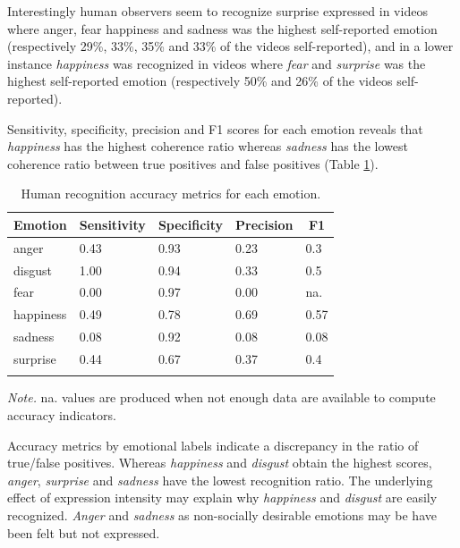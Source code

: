 \documentclass[
  english,
  doc]{apa7}
\begin{document}
Interestingly human observers seem to recognize surprise expressed in videos where anger, fear happiness and sadness was the highest self-reported emotion (respectively 29\%, 33\%, 35\% and 33\% of the videos self-reported), and in a lower instance \emph{happiness} was recognized in videos where \emph{fear} and \emph{surprise} was the highest self-reported emotion (respectively 50\% and 26\% of the videos self-reported).

Sensitivity, specificity, precision and F1 scores for each emotion reveals that \emph{happiness} has the highest coherence ratio whereas \emph{sadness} has the lowest coherence ratio between true positives and false positives (Table \ref{tab:confusionTable-sr-hr}).

\begin{table}[tbp]

\begin{center}
\begin{threeparttable}

\caption{\label{tab:confusionTable-sr-hr}Human recognition accuracy metrics for each emotion.}

\begin{tabular}{lllll}
\toprule
Emotion & \multicolumn{1}{c}{Sensitivity} & \multicolumn{1}{c}{Specificity} & \multicolumn{1}{c}{Precision} & \multicolumn{1}{c}{F1}\\
\midrule
anger & 0.43 & 0.93 & 0.23 & 0.3\\
disgust & 1.00 & 0.94 & 0.33 & 0.5\\
fear & 0.00 & 0.97 & 0.00 & na.\\
happiness & 0.49 & 0.78 & 0.69 & 0.57\\
sadness & 0.08 & 0.92 & 0.08 & 0.08\\
surprise & 0.44 & 0.67 & 0.37 & 0.4\\
\bottomrule
\addlinespace
\end{tabular}

\begin{tablenotes}[para]
\normalsize{\textit{Note.} na. values are produced when not enough data are available to compute accuracy indicators.}
\end{tablenotes}

\end{threeparttable}
\end{center}

\end{table}

Accuracy metrics by emotional labels indicate a discrepancy in the ratio of true/false positives. Whereas \emph{happiness} and \emph{disgust} obtain the highest scores, \emph{anger}, \emph{surprise} and \emph{sadness} have the lowest recognition ratio. The underlying effect of expression intensity may explain why \emph{happiness} and \emph{disgust} are easily recognized. \emph{Anger} and \emph{sadness} as non-socially desirable emotions may be have been felt but not expressed.
\end{document}
